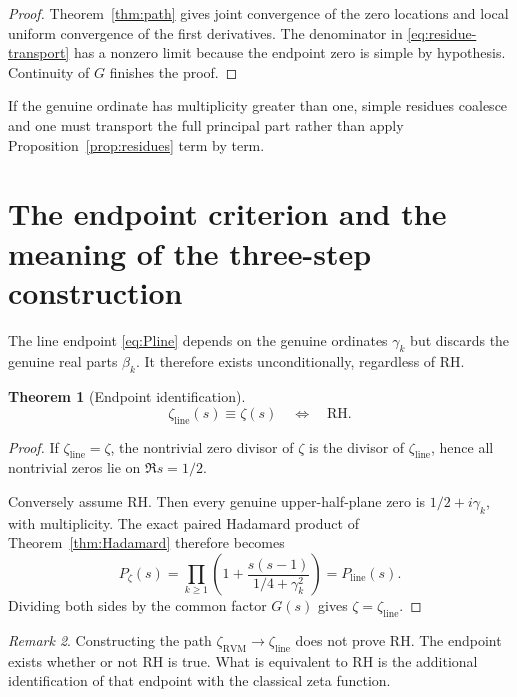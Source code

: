 \documentclass[11pt,reqno]{amsart}
\newtheorem{theorem}{Theorem}[section]
\theoremstyle{definition}
\theoremstyle{remark}
\newtheorem{remark}[theorem]{Remark}
\newcommand{\RVM}{\mathrm{RVM}}
\newcommand{\linez}{\mathrm{line}}
\begin{document}
\begin{proof}
Theorem~\ref{thm:path} gives joint convergence of the zero locations and local uniform convergence of the first derivatives.  The denominator in \eqref{eq:residue-transport} has a nonzero limit because the endpoint zero is simple by hypothesis.  Continuity of $G$ finishes the proof.
\end{proof}

If the genuine ordinate has multiplicity greater than one, simple residues coalesce and one must transport the full principal part rather than apply Proposition~\ref{prop:residues} term by term.

\section{The endpoint criterion and the meaning of the three-step construction}

The line endpoint \eqref{eq:Pline} depends on the genuine ordinates $\gamma_k$ but discards the genuine real parts $\beta_k$.  It therefore exists unconditionally, regardless of RH.

\begin{theorem}[Endpoint identification]\label{thm:endpoint-RH}
\begin{equation}\label{eq:endpoint-RH}
 \boxed{
 \zeta_{\linez}(s)\equiv\zeta(s)
 \quad\Longleftrightarrow\quad
 \mathrm{RH}.}
\end{equation}
\end{theorem}

\begin{proof}
If $\zeta_{\linez}=\zeta$, the nontrivial zero divisor of $\zeta$ is the divisor of $\zeta_{\linez}$, hence all nontrivial zeros lie on $\Re s=1/2$.

Conversely assume RH.  Then every genuine upper-half-plane zero is $1/2+i\gamma_k$, with multiplicity.  The exact paired Hadamard product of Theorem~\ref{thm:Hadamard} therefore becomes
\[
 P_\zeta(s)
 =\prod_{k\ge1}
 \left(1+\frac{s(s-1)}{1/4+\gamma_k^2}\right)
 =P_{\linez}(s).
\]
Dividing both sides by the common factor $G(s)$ gives
$\zeta=\zeta_{\linez}$.
\end{proof}

\begin{remark}
Constructing the path $\zeta_{\RVM}\to\zeta_{\linez}$ does not prove RH.  The endpoint exists whether or not RH is true.  What is equivalent to RH is the additional identification of that endpoint with the classical zeta function.
\end{remark}
\end{document}
